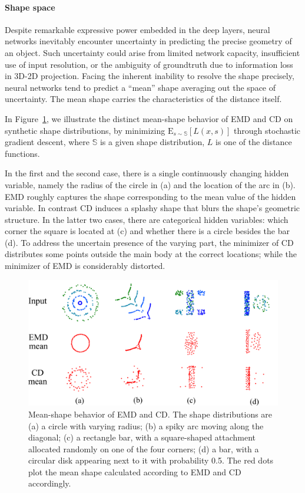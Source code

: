 \paragraph{Shape space}
Despite remarkable expressive power embedded in the deep layers, neural networks inevitably encounter uncertainty in predicting the precise geometry of an object. Such uncertainty could arise from limited network capacity, insufficient use of input resolution, or the ambiguity of groundtruth due to information loss in 3D-2D projection. Facing the inherent inability to resolve the shape precisely, neural networks tend to predict a ``mean'' shape averaging out the space of uncertainty. The mean shape carries the characteristics of the distance itself.

In Figure~\ref{fig:mean}, we illustrate the distinct mean-shape behavior of EMD and CD on synthetic shape distributions, by minimizing
$\mathrm{E}_{s\sim \mathbb{S}}[L(x,s)]$
through stochastic gradient descent, where $\mathbb{S}$ is a given shape distribution, $L$ is one of the distance functions. 

In the first and the second case, there is a single continuously changing hidden variable, namely the radius of the circle in (a) and the location of the arc in (b). EMD roughly captures the shape corresponding to the mean value of the hidden variable. In contrast CD induces a splashy shape that blurs the shape's geometric structure. In the latter two cases, there are categorical hidden variables: which corner the square is located at (c) and whether there is a circle besides the bar (d). To address the uncertain presence of the varying part, the minimizer of CD distributes some points outside the main body at the correct locations; while the minimizer of EMD is considerably distorted.

\begin{figure}[t!]
\centering
\includegraphics[width=0.9\linewidth]{./fig/show_mean.pdf}
\caption{Mean-shape behavior of EMD and CD. The shape distributions are (a) a circle with varying radius; (b) a spiky arc moving along the diagonal; (c) a rectangle bar, with a square-shaped attachment allocated randomly on one of the four corners; (d) a bar, with a circular disk appearing next to it with probability 0.5. The red dots plot the mean shape calculated according to EMD and CD accordingly.}
\label{fig:mean}
\end{figure}


